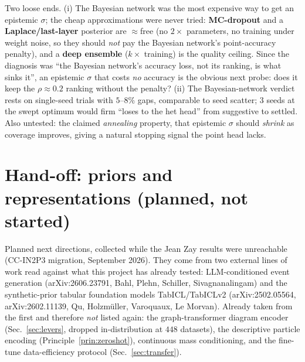 \documentclass[11pt]{article}
\begin{document}
\begin{itemize}
    Two loose ends. (i) The Bayesian network was the most expensive way to get an epistemic $\sigma$; the cheap
    approximations were never tried: \textbf{MC-dropout} and a \textbf{Laplace/last-layer} posterior are
    $\approx$free (no $2\times$ parameters, no training under weight noise, so they should \emph{not} pay
    the Bayesian network's point-accuracy penalty), and a \textbf{deep ensemble} ($k\times$ training) is the quality ceiling.
    Since the diagnosis was ``the Bayesian network's accuracy loss, not its ranking, is what sinks it'', an epistemic
    $\sigma$ that costs \emph{no} accuracy is the obvious next probe: does it keep the
    $\rho\!\approx\!0.2$ ranking without the penalty? (ii) The Bayesian-network verdict rests on single-seed trials with
    $5$--$8\%$ gaps, comparable to seed scatter; $3$ seeds at the swept optimum would firm ``loses to the
    het head'' from suggestive to settled. Also untested: the claimed \emph{annealing} property, that epistemic
    $\sigma$ should \emph{shrink} as coverage improves, giving a natural stopping signal the point head lacks.
\end{itemize}

\section{Hand-off: priors and representations (planned, not started)}\label{sec:prior-open}
Planned next directions, collected while the Jean Zay results were unreachable (CC-IN2P3
migration, September 2026). They come from two external lines of work read against what this
project has already tested: LLM-conditioned event generation (arXiv:2606.23791, Bahl, Plehn,
Schiller, Sivagnanalingam) and the synthetic-prior tabular foundation models TabICL/TabICLv2
(arXiv:2502.05564, arXiv:2602.11139, Qu, Holzm\"uller, Varoquaux, Le Morvan). Already taken
from the first and therefore \emph{not} listed again: the graph-transformer diagram encoder
(Sec.~\ref{sec:levers}, dropped in-distribution at $448$ datasets), the descriptive
particle encoding (Principle~\ref{prin:zeroshot}), continuous mass conditioning, and the
fine-tune data-efficiency protocol (Sec.~\ref{sec:transfer}).
\end{document}
